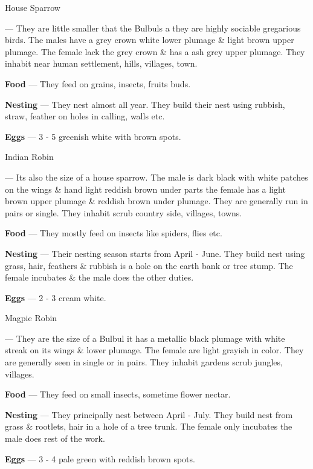 \begin{bird}{House Sparrow}

 --- They are little smaller that the Bulbuls a they are highly sociable gregarious birds. The males have a grey crown white lower plumage \& light brown upper plumage. The female lack the grey crown \& has a ash grey upper plumage. They inhabit near human settlement, hills, villages, town. 

{\large\bf Food} --- They feed on grains, insects, fruits buds.

{\large\bf Nesting} --- They nest almost all year. They build their nest using rubbish, straw, feather on holes in calling, walls etc.

{\large\bf Eggs} --- 3 - 5 greenish white with brown spots.
\end{bird}

\begin{bird}{Indian Robin}

 --- Its also the size of a house sparrow. The male is dark black with white patches on the wings \& hand light reddish brown under parts the female has a light brown upper plumage \& reddish brown under plumage. They are generally run in pairs or single. They inhabit scrub country side, villages, towns.

{\large\bf Food} --- They mostly feed on insects like spiders, flies etc.

{\large\bf Nesting} --- Their nesting season starts from April - June. They build nest using grass, hair, feathers  \& rubbish is a hole on the earth bank or tree stump. The female incubates \& the male does the other duties.

{\large\bf Eggs} --- 2 - 3 cream white.
\end{bird}

\begin{bird}{Magpie Robin}

 --- They are the size of a Bulbul it has a metallic black plumage with white streak on its wings \& lower plumage. The female are light grayish in color. They are generally seen in single or in pairs. They inhabit gardens scrub jungles, villages.

{\large\bf Food} --- They feed on small insects, sometime flower nectar.

{\large\bf Nesting} --- They principally nest between April - July. They build nest from grass \& rootlets, hair in a hole of a tree trunk. The female only incubates the male does rest of the work.

{\large\bf Eggs} --- 3 - 4 pale green with reddish brown spots.
\end{bird}

